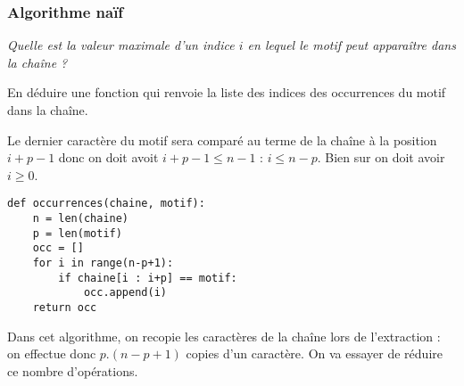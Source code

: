 \subsubsection{Algorithme naïf}
\begin{Exercise}\it 
Quelle est la valeur maximale d'un indice $i$ en lequel le motif peut apparaître dans la chaîne ? 

En déduire une fonction  qui renvoie la liste des indices des occurrences du motif dans la chaîne.
\end{Exercise}
\begin{Answer}
Le dernier caractère du motif sera comparé au terme de la chaîne à la position $i + p - 1$ donc on doit avoit $i+p-1 \le n-1$ : $i \le n-p$. Bien sur on doit avoir $i\ge 0$.
\begin{lstlisting}
def occurrences(chaine, motif):
    n = len(chaine)
    p = len(motif)
    occ = []
    for i in range(n-p+1):
        if chaine[i : i+p] == motif:
            occ.append(i)
    return occ
\end{lstlisting}
\end{Answer}

Dans cet algorithme, on recopie les caractères de la chaîne lors de l'extraction : on effectue donc $p.(n-p+1)$ copies d'un caractère. On va essayer de réduire ce nombre d'opérations.
\newpage
